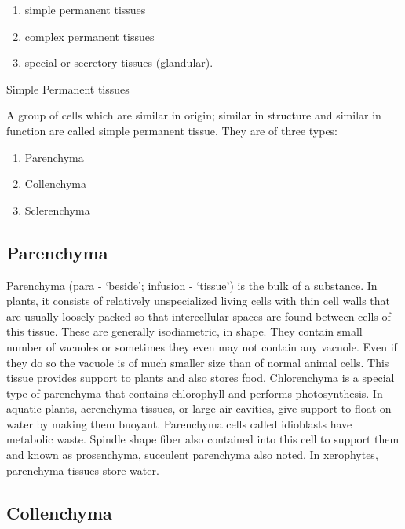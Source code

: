 \begin{enumerate}
\def\labelenumi{\arabic{enumi}.}
\tightlist
\item
  simple permanent tissues
\item
  complex permanent tissues
\item
  special or secretory tissues (glandular).
\end{enumerate}

Simple Permanent tissues

A group of cells which are similar in origin; similar in structure and similar in function are called simple permanent tissue. They are of three types:

\begin{enumerate}
\def\labelenumi{\arabic{enumi}.}
\tightlist
\item
  Parenchyma
\item
  Collenchyma
\item
  Sclerenchyma
\end{enumerate}

\hypertarget{parenchyma}{%
\subsection{Parenchyma}\label{parenchyma}}

Parenchyma (para - `beside'; infusion - `tissue') is the bulk of a substance. In plants, it consists of relatively unspecialized living cells with thin cell walls that are usually loosely packed so that intercellular spaces are found between cells of this tissue. These are generally isodiametric, in shape. They contain small number of vacuoles or sometimes they even may not contain any vacuole. Even if they do so the vacuole is of much smaller size than of normal animal cells. This tissue provides support to plants and also stores food. Chlorenchyma is a special type of parenchyma that contains chlorophyll and performs photosynthesis. In aquatic plants, aerenchyma tissues, or large air cavities, give support to float on water by making them buoyant. Parenchyma cells called idioblasts have metabolic waste. Spindle shape fiber also contained into this cell to support them and known as prosenchyma, succulent parenchyma also noted. In xerophytes, parenchyma tissues store water.

\hypertarget{collenchyma}{%
\subsection{Collenchyma}\label{collenchyma}}

